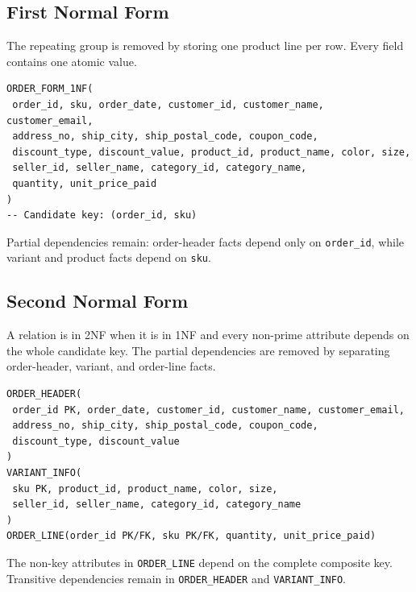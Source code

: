 \documentclass[11pt,a4paper,oneside]{report}
\begin{document}
\subsection{First Normal Form}
The repeating group is removed by storing one product line per row. Every field contains one atomic value.
\begin{lstlisting}[caption={Order form in first normal form}]
ORDER_FORM_1NF(
 order_id, sku, order_date, customer_id, customer_name, customer_email,
 address_no, ship_city, ship_postal_code, coupon_code,
 discount_type, discount_value, product_id, product_name, color, size,
 seller_id, seller_name, category_id, category_name,
 quantity, unit_price_paid
)
-- Candidate key: (order_id, sku)
\end{lstlisting}
Partial dependencies remain: order-header facts depend only on \texttt{order\_id}, while variant and product facts depend on \texttt{sku}.

\subsection{Second Normal Form}
A relation is in 2NF when it is in 1NF and every non-prime attribute depends on the whole candidate key. The partial dependencies are removed by separating order-header, variant, and order-line facts.
\begin{lstlisting}[caption={Decomposition into second normal form}]
ORDER_HEADER(
 order_id PK, order_date, customer_id, customer_name, customer_email,
 address_no, ship_city, ship_postal_code, coupon_code,
 discount_type, discount_value
)
VARIANT_INFO(
 sku PK, product_id, product_name, color, size,
 seller_id, seller_name, category_id, category_name
)
ORDER_LINE(order_id PK/FK, sku PK/FK, quantity, unit_price_paid)
\end{lstlisting}
The non-key attributes in \texttt{ORDER\_LINE} depend on the complete composite key. Transitive dependencies remain in \texttt{ORDER\_HEADER} and \texttt{VARIANT\_INFO}.
\end{document}
